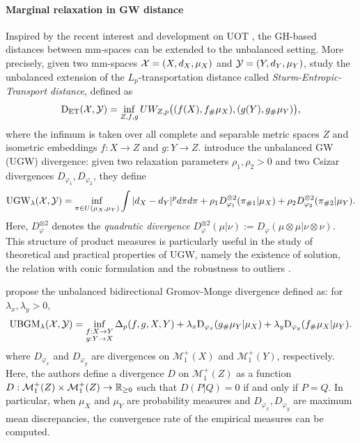 \paragraph{Marginal relaxation in GW distance} Inspired by the recent interest and development
on UOT \citep{Liero18}, the GH-based distances between mm-spaces can be extended to
the unbalanced setting. More precisely, given two mm-spaces
$\mathcal X = (X, d_X, \mu_X)$ and $\mathcal Y = (Y, d_Y, \mu_Y)$, \citep{Ponti20}
study the unbalanced extension of the $L_p$-transportation distance called
\textit{Sturm-Entropic-Transport distance}, defined as
\begin{equation}
  \text{D}_{\text{ET}}(\mathcal X, \mathcal Y) =
  \inf_{Z, f, g} UW_{Z, p}\big( (f(X), f_{\#} \mu_X), (g(Y), g_{\#} \mu_Y) \big),
\end{equation}
where the infimum is taken over all complete and separable metric spaces $Z$ and
isometric embeddings $f: X \to Z$ and $g: Y \to Z$. \citep{Sejourne20} introduce the
unbalanced GW (UGW) divergence: given two relaxation parameters
$\rho_1, \rho_2 > 0$ and two Csizar divergences $D_{\varphi_1}, D_{\varphi_2}$, they define
\begin{equation}
  \text{UGW}_{\lambda}(\mathcal X, \mathcal Y) =
  \inf_{ \pi \in U(\mu_X, \mu_Y)} \int |d_X - d_Y|^p d\pi d\pi +
  \rho_1 D_{\varphi_1}^{\otimes 2}(\pi_{\# 1} | \mu_X) +
  \rho_2 D_{\varphi_2}^{\otimes 2}(\pi_{\# 2} | \mu_Y).
\end{equation}
Here, $D_{\varphi}^{\otimes 2}$ denotes the \textit{quadratic divergence}
$D_{\varphi}^{\otimes 2}(\mu | \nu) := D_{\varphi}(\mu \otimes \mu | \nu \otimes \nu)$.
This structure of product measures is particularly useful in the study of theoretical
and practical properties of UGW, namely the existence of solution,
the relation with conic formulation \citep{Sejourne20} and the robustness to outliers \citep{Tran23}.

\citep{Zhang21} propose the unbalanced bidirectional Gromov-Monge divergence defined as:
for $\lambda_x, \lambda_y > 0$,
\begin{equation}
  \begin{split}
    \text{UBGM}_{\lambda}(\mathcal X, \mathcal Y) = \inf_{\substack{f: X \to Y \\ g: Y \to X}}
  \Delta_p(f,g, X, Y) + \lambda_x \text{D}_{\varphi_x}(g_{\#} \mu_Y | \mu_X)
  + \lambda_y \text{D}_{\varphi_y}(f_{\#}\mu_X | \mu_Y).
  \end{split}
\end{equation}
where $D_{\varphi_x}$ and $D_{\varphi_y}$ are divergences on $\mathcal M^+_1(X)$ and $\mathcal M^+_1(Y)$,
respectively. Here, the authors define a divergence $D$ on $\mathcal M^+_1(Z)$ as a function
$D: \mathcal M^+_1(Z) \times \mathcal M^+_1(Z) \to \mathbb R_{\geq 0}$ such that
$D(P | Q) = 0$ if and only if $P = Q$. In particular, when $\mu_X$ and $\mu_Y$
are probability measures and $D_{\varphi_x}, D_{\varphi_y}$ are maximum mean discrepancies,
the convergence rate of the empirical measures can be computed.

